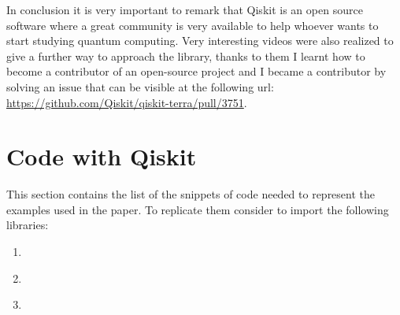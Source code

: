 \documentclass[english]{article}
\begin{document}
\begin{appendices}
			In conclusion it is very important to remark that Qiskit is an open source software where a great community is very available to help whoever wants to start studying quantum computing. Very interesting videos were also realized to give a further way to approach the library, thanks to them I learnt how to become a contributor of an open-source project and I became a contributor by solving an issue that can be visible at the following url: \url{https://github.com/Qiskit/qiskit-terra/pull/3751}.
		
		\section{Code with Qiskit}
		This section contains the list of the snippets of code needed to represent the examples used in the paper. To replicate them consider to import the following libraries:
		
		
		\label{sec:codeWithQiskit}
			\begin{enumerate}
				\item \label{c:example3} 
				
				\item \label{c:example6} 
				
				\item \label{c:decisionCircuit} 
			\end{enumerate}
	\end{appendices}
	
	\clearpage
	
	\nocite{*}
	
\end{document}
